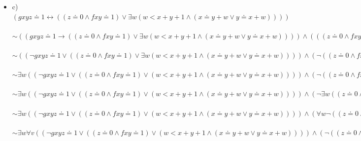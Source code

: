 \documentclass[a4paper]{scrartcl}
\begin{document}
\begin{itemize}
        \item c)\\
            $(gxyz \doteq 1 \leftrightarrow ((z \doteq 0 \land fxy \doteq 1) \lor \exists w (w < x + y + 1 \land (x \doteq y + w \lor y \doteq x + w))))$\\
            \\$\sim ((gxyz \doteq 1 \rightarrow ((z \doteq 0 \land fxy \doteq 1) \lor \exists w (w < x + y + 1 \land (x \doteq y + w \lor y \doteq x + w))))
            \land (((z \doteq 0 \land fxy \doteq 1) \lor \exists w (w < x + y + 1 \land (x \doteq y + w \lor y \doteq x + w))) \rightarrow gxyz \doteq 1))$\\
            \\$\sim ((\neg gxyz \doteq 1 \lor ((z \doteq 0 \land fxy \doteq 1) \lor \exists w (w < x + y + 1 \land (x \doteq y + w \lor y \doteq x + w))))
            \land (\neg((z \doteq 0 \land fxy \doteq 1) \lor \exists w (w < x + y + 1 \land (x \doteq y + w \lor y \doteq x + w))) \lor gxyz \doteq 1))$\\
            \\$\sim \exists w ((\neg gxyz \doteq 1 \lor ((z \doteq 0 \land fxy \doteq 1) \lor (w < x + y + 1 \land (x \doteq y + w \lor y \doteq x + w))))
            \land (\neg((z \doteq 0 \land fxy \doteq 1) \lor \exists w (w < x + y + 1 \land (x \doteq y + w \lor y \doteq x + w))) \lor gxyz \doteq 1))$\\
            \\$\sim \exists w ((\neg gxyz \doteq 1 \lor ((z \doteq 0 \land fxy \doteq 1) \lor (w < x + y + 1 \land (x \doteq y + w \lor y \doteq x + w))))
            \land (\neg \exists w((z \doteq 0 \land fxy \doteq 1) \lor (w < x + y + 1 \land (x \doteq y + w \lor y \doteq x + w))) \lor gxyz \doteq 1))$\\
            \\$\sim \exists w ((\neg gxyz \doteq 1 \lor ((z \doteq 0 \land fxy \doteq 1) \lor (w < x + y + 1 \land (x \doteq y + w \lor y \doteq x + w))))
            \land (\forall w \neg ((z \doteq 0 \land fxy \doteq 1) \lor (w < x + y + 1 \land (x \doteq y + w \lor y \doteq x + w))) \lor gxyz \doteq 1))$\\
            \\$\sim \exists w \forall v((\neg gxyz \doteq 1 \lor ((z \doteq 0 \land fxy \doteq 1) \lor (w < x + y + 1 \land (x \doteq y + w \lor y \doteq x + w))))
            \land (\neg ((z \doteq 0 \land fxy \doteq 1) \lor (v < x + y + 1 \land (x \doteq y + v \lor y \doteq x + v))) \lor gxyz \doteq 1))$\\


    \end{itemize}
\end{document}
